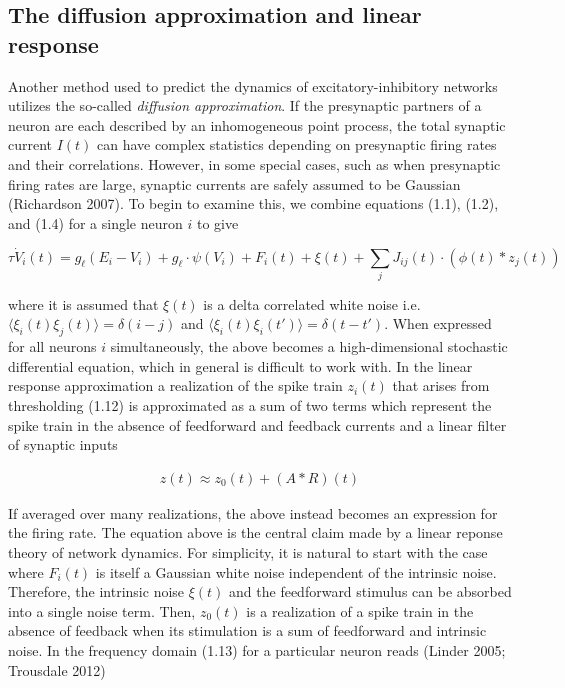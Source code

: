 \documentclass{ucetd}
\begin{document}
\subsection{The diffusion approximation and linear response}

Another method used to predict the dynamics of excitatory-inhibitory networks utilizes the so-called \emph{diffusion approximation}. If the presynaptic partners of a neuron are each described by an inhomogeneous point process, the total synaptic current $I(t)$ can have complex statistics depending on presynaptic firing rates and their correlations. However, in some special cases, such as when presynaptic firing rates are large, synaptic currents are safely assumed to be Gaussian (Richardson 2007). To begin to examine this, we combine equations (1.1), (1.2), and (1.4) for a single neuron $i$ to give 

\begin{equation}
\tau\dot{V}_{i}(t) = g_{\ell}(E_{i} - V_{i}) + g_{\ell}\cdot\psi(V_{i}) + F_{i}(t) + \xi(t) + \sum_{j} J_{ij}(t)\cdot \left(\phi(t) * z_{j}(t)\right)
\end{equation}

where it is assumed that $\xi(t)$ is a delta correlated white noise i.e. $\langle\xi_{i}(t)\xi_{j}(t)\rangle = \delta(i-j)$ and $\langle\xi_{i}(t)\xi_{i}(t')\rangle = \delta(t-t')$. When expressed for all neurons $i$ simultaneously, the above becomes a high-dimensional stochastic differential equation, which in general is difficult to work with. In the linear response approximation a realization of the spike train $z_{i}(t)$ that arises from thresholding (1.12) is approximated as a sum of two terms which represent the spike train in the absence of feedforward and feedback currents and a linear filter of synaptic inputs

\begin{align}
z(t) \approx z_{0}(t) + (A * R)(t) 
\end{align}

If averaged over many realizations, the above instead becomes an expression for the firing rate. The equation above is the central claim made by a linear reponse theory of network dynamics. For simplicity, it is natural to start with the case where $F_{i}(t)$ is itself a Gaussian white noise independent of the intrinsic noise. Therefore, the intrinsic noise $\xi(t)$ and the feedforward stimulus can be absorbed into a single noise term. Then, $z_{0}(t)$ is a realization of a spike train in the absence of feedback when its stimulation is a sum of feedforward and intrinsic noise. In the frequency domain (1.13) for a particular neuron reads (Linder 2005; Trousdale 2012)
\end{document}

